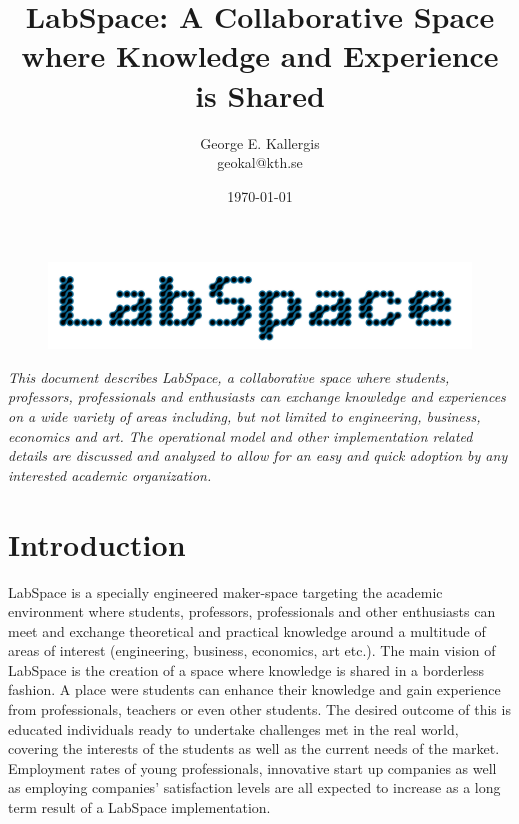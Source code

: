 \documentclass[a4paper, 11pt]{article}
\title{LabSpace: A Collaborative Space where Knowledge and Experience is Shared}
\author{George E. Kallergis\\geokal@kth.se}
\date{\today{}}
\begin{document}
\maketitle

\begin{figure}[h!]
  \begin{center}
    \includegraphics[width=\textwidth,height=\textheight,keepaspectratio]{imagery/logo.png}
    \label{fig:dneaf}
  \end{center}
\end{figure}

\textit{This document describes LabSpace, a collaborative space where students, professors, professionals and enthusiasts can exchange knowledge and experiences on a wide variety of areas including, but not limited to engineering, business, economics and art. The operational model and other implementation related details are discussed and analyzed to allow for an easy and quick adoption by any interested academic organization.}

\newpage

\section*{Introduction}
LabSpace is a specially engineered maker-space \cite{whatsamakerspace} targeting the academic environment where students, professors, professionals and other enthusiasts can meet and exchange theoretical and practical knowledge around a multitude of areas of interest (engineering, business, economics, art etc.). The main vision of LabSpace is the creation of a space where knowledge is shared in a borderless fashion. A place were students can enhance their knowledge and gain experience from  professionals, teachers or even other students. The desired outcome of this is educated individuals ready to undertake challenges met in the real world, covering  the interests of the students as well as the current needs of the market. Employment rates of young professionals, innovative start up companies as well as employing companies' satisfaction levels are all expected to increase as a long term result of a LabSpace implementation.
\end{document}
